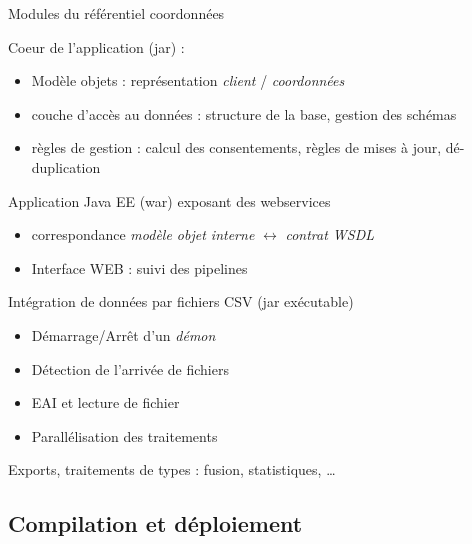 \documentclass[compact]{beamer}%
\begin{document}
\begin{frame}{Modules du référentiel coordonnées}
	\begin{description}[<+->]
	\item[Core] Coeur de l'application (jar) :
		\begin{itemize}
		\item Modèle objets : représentation \emph{client} / \emph{coordonnées}
		\item couche d'accès au données : structure de la base, gestion des schémas
		\item règles de gestion : calcul des consentements, règles de mises à jour, dé-duplication
		\end{itemize}
	\item[Webservices] Application Java EE (war) exposant des webservices
		\begin{itemize}
		\item correspondance \emph{modèle objet interne} $\leftrightarrow$ \emph{contrat WSDL}
		\item Interface WEB : suivi des pipelines
		\end{itemize}
	\item[Pipelines] Intégration de données par fichiers CSV (jar exécutable)
		\begin{itemize}
		\item Démarrage/Arrêt d'un \emph{démon}
		\item Détection de l'arrivée de fichiers
		\item EAI et lecture de fichier
		\item Parallélisation des traitements
		\end{itemize}
	\item[Batch] Exports, traitements de types : fusion, statistiques, \dots
	\end{description}
\end{frame}


\subsection{Compilation et déploiement}
\end{document}
